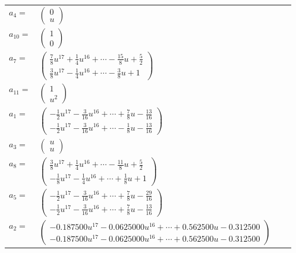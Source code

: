 \documentclass[1p]{elsarticle_modified}
\theoremstyle{definition}
\begin{document}
\begin{tabular}{m{7pt} m{180pt} m{7pt} m{180pt} }
\flushright $a_{4}=$&$\begin{pmatrix}0\\u\end{pmatrix}$ \\
\flushright $a_{10}=$&$\begin{pmatrix}1\\0\end{pmatrix}$ \\
\flushright $a_{7}=$&$\begin{pmatrix}\frac{7}{8} u^{17}+\frac{1}{4} u^{16}+\cdots-\frac{15}{8} u+\frac{5}{2}\\\frac{3}{8} u^{17}-\frac{1}{4} u^{16}+\cdots-\frac{3}{8} u+1\end{pmatrix}$ \\
\flushright $a_{11}=$&$\begin{pmatrix}1\\u^2\end{pmatrix}$ \\
\flushright $a_{1}=$&$\begin{pmatrix}-\frac{1}{2} u^{17}-\frac{3}{16} u^{16}+\cdots+\frac{7}{8} u-\frac{13}{16}\\-\frac{1}{2} u^{17}-\frac{3}{16} u^{16}+\cdots-\frac{1}{8} u-\frac{13}{16}\end{pmatrix}$ \\
\flushright $a_{3}=$&$\begin{pmatrix}u\\u\end{pmatrix}$ \\
\flushright $a_{8}=$&$\begin{pmatrix}\frac{3}{8} u^{17}+\frac{1}{4} u^{16}+\cdots-\frac{11}{8} u+\frac{5}{2}\\-\frac{1}{8} u^{17}-\frac{1}{4} u^{16}+\cdots+\frac{1}{8} u+1\end{pmatrix}$ \\
\flushright $a_{5}=$&$\begin{pmatrix}-\frac{1}{2} u^{17}-\frac{3}{16} u^{16}+\cdots+\frac{7}{8} u-\frac{29}{16}\\-\frac{1}{2} u^{17}-\frac{3}{16} u^{16}+\cdots+\frac{7}{8} u-\frac{13}{16}\end{pmatrix}$ \\
\flushright $a_{2}=$&$\begin{pmatrix}-0.187500 u^{17}-0.0625000 u^{16}+\cdots+0.562500 u-0.312500\\-0.187500 u^{17}-0.0625000 u^{16}+\cdots+0.562500 u-0.312500\end{pmatrix}$ \\

\end{tabular}
\end{document}
